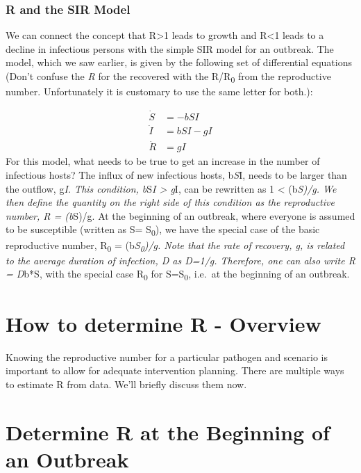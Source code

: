 \documentclass[]{book}
\theoremstyle{definition}
\theoremstyle{definition}
\theoremstyle{definition}
\theoremstyle{remark}
\begin{document}
\subsubsection{R and the SIR Model}\label{myadvancedbox}

We can connect the concept that R\textgreater{}1 leads to growth and
R\textless{}1 leads to a decline in infectious persons with the simple
SIR model for an outbreak. The model, which we saw earlier, is given by
the following set of differential equations (Don't confuse the \emph{R}
for the recovered with the R/R\textsubscript{0} from the reproductive
number. Unfortunately it is customary to use the same letter for both.):

\[ 
\begin{aligned}
\dot S &= - b SI \\
\dot I &= b S I - g I \\
\dot R &= g I
\end{aligned}
\] For this model, what needs to be true to get an increase in the
number of infectious hosts? The influx of new infectious hosts,
b\emph{S}I, needs to be larger than the outflow, g\emph{I. This
condition, b}S\emph{I \textgreater{} g}I, can be rewritten as 1
\textless{} (b\emph{S)/g. We then define the quantity on the right side
of this condition as the reproductive number, R = (b}S)/g. At the
beginning of an outbreak, where everyone is assumed to be susceptible
(written as S= S\textsubscript{0}), we have the special case of the
basic reproductive number, R\textsubscript{0} =
(b\emph{S\textsubscript{0})/g. Note that the rate of recovery, g, is
related to the average duration of infection, D as D=1/g. Therefore, one
can also write R = D}b*S, with the special case R\textsubscript{0} for
S=S\textsubscript{0}, i.e.~at the beginning of an outbreak.

\section{How to determine R -
Overview}\label{how-to-determine-r---overview}

Knowing the reproductive number for a particular pathogen and scenario
is important to allow for adequate intervention planning. There are
multiple ways to estimate R from data. We'll briefly discuss them now.

\section{Determine R at the Beginning of an
Outbreak}\label{determine-r-at-the-beginning-of-an-outbreak}
\end{document}
